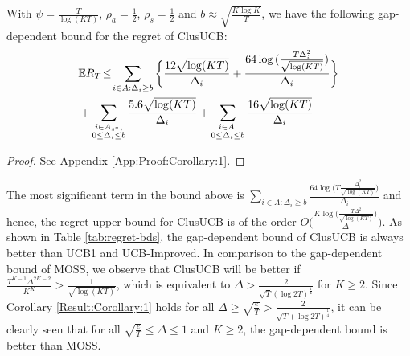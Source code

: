 \begin{corollary}
\label{Result:Corollary:1}
With $\psi=\frac{T}{\log (KT)}$, $\rho_{a}=\frac{1}{2}$, $\rho_{s}=\frac{1}{2} $ and $b\approx\sqrt{\frac{K\log K}{T}}$,  we have the following gap-dependent bound for the regret of ClusUCB:
\begin{align*}
&\mathbb{E} R_T \!\le\! \sum_{i\in A:\Delta_{i}\geq b}\bigg\lbrace\dfrac{12\sqrt{\log (KT)}}{\Delta_{i}}  + \dfrac{64\log{(\frac{T\Delta_{i}^{2}}{\sqrt{\log (KT)}})}}{\Delta_{i}}\bigg\rbrace \\
&+ \sum\limits_{\substack{i\in A_{s^{*}},\\0\leq\Delta_{i}\leq b}}\dfrac{5.6\sqrt{\log (KT)}}{\Delta_{i}} + \sum\limits_{\substack{i\in A,\\0\leq\Delta_{i}\leq b}}\dfrac{16\sqrt{\log (KT)}}{\Delta_{i}} 
\end{align*}
\end{corollary}
\begin{proof}
 See Appendix \ref{App:Proof:Corollary:1}.
\end{proof}

The most significant term in the bound above is $\sum_{i\in A:\Delta_{i}\geq b}\frac{64\log{\big(T\frac{\Delta_{i}^{2}}{\sqrt{\log (KT)}}\big)}}{\Delta_{i}}$ and hence, the regret upper bound for ClusUCB is of the order $O\bigg(\frac{K\log \big(\frac{T\Delta^{2}}{\sqrt{\log (KT)}}\big)}{\Delta}\bigg)$. As shown in Table \ref{tab:regret-bds}, the gap-dependent bound of ClusUCB is always better than UCB1 and UCB-Improved. 
%
In comparison to the gap-dependent bound of MOSS, we observe that ClusUCB will be better if 
$\frac{T^{K-1}\Delta^{2K-2}}{K^{K}} > \frac{1}{\sqrt{\log(KT)}}$, which is equivalent to $\Delta > \frac{2}{\sqrt{T}(\log 2T)^{\frac{1}{4}}}$ for
$K\geq 2$. Since Corollary \ref{Result:Corollary:1} holds for all $\Delta \geq \sqrt{\frac{e}{T}} > \frac{2}{\sqrt{T}(\log 2T)^{\frac{1}{4}}}$, it can be clearly seen that for all $\sqrt{\frac{e}{T}} \leq \Delta\leq 1$ and $K\geq 2$, the gap-dependent bound is better than MOSS.

